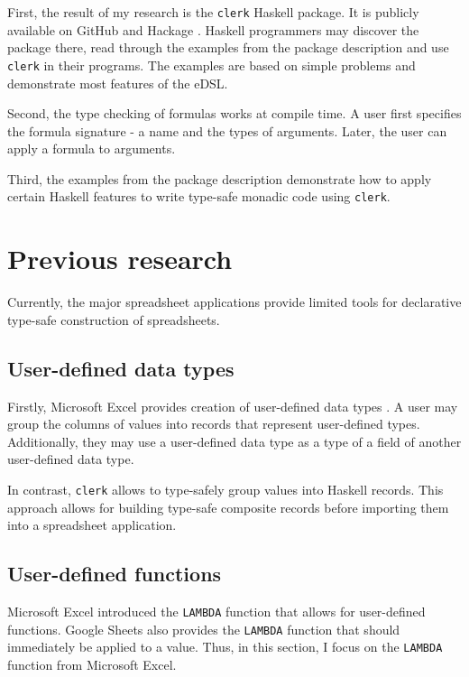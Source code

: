 First, the result of my research is the \texttt{clerk} Haskell package.
It is publicly available on GitHub \cite{danko_clerk_2023} and Hackage \cite{hackage_clerk_2023}.
Haskell programmers may discover the package there, read through the examples from the package description and use \texttt{clerk} in their programs.
The examples are based on simple problems and demonstrate most features of the eDSL.

Second, the type checking of formulas works at compile time.
A user first specifies the formula signature - a name and the types of arguments.
Later, the user can apply a formula to arguments.

Third, the examples from the package description demonstrate how to apply certain Haskell features to write type-safe monadic code using \texttt{clerk}.

\section{Previous research}
\label{eval:previous-research}

Currently, the major spreadsheet applications provide limited tools for declarative type-safe construction of spreadsheets.

\subsection{User-defined data types}
\label{subsec:user-defined-data-types}
Firstly, Microsoft Excel provides creation of user-defined data types \cite{excel_custom_types}.
A user may group the columns of values into records that represent user-defined types.
Additionally, they may use a user-defined data type as a type of a field of another user-defined data type.

In contrast, \texttt{clerk} allows to type-safely group values into Haskell records.
This approach allows for building type-safe composite records before importing them into a spreadsheet application.

\subsection{User-defined functions}

Microsoft Excel introduced the \texttt{LAMBDA} function \cite{excel_lambda} that allows for user-defined functions.
Google Sheets also provides the \texttt{LAMBDA} function \cite{sheets_lambda} that should immediately be applied to a value.
Thus, in this section, I focus on the \texttt{LAMBDA} function from Microsoft Excel.

